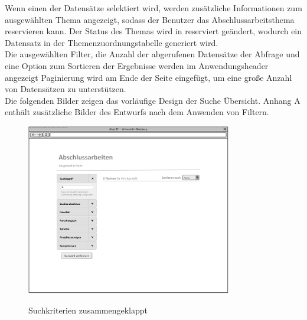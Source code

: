 Wenn einen der Datensätze selektiert wird, werden zusätzliche Informationen zum ausgewählten Thema angezeigt, sodass der Benutzer das Abschlussarbeitsthema reservieren kann. Der Status des Themas wird in reserviert geändert, wodurch ein Datensatz in der Themenzuordnungstabelle generiert wird.\\
Die ausgewählten Filter, die Anzahl der abgerufenen Datensätze der Abfrage und eine Option zum Sortieren der Ergebnisse werden im Anwendungsheader angezeigt
Paginierung wird am Ende der Seite eingefügt, um eine gro{\ss}e Anzahl von Datensätzen zu unterstützen.\\

Die folgenden Bilder zeigen das vorläufige Design der Suche Übersicht. Anhang A enthält zusätzliche Bilder des Entwurfs nach dem Anwenden von Filtern.

\begin{figure}[hp]%
    \centering
    \includegraphics[height=7.5cm,keepaspectratio]{pics/app_collapsed}\\
    \caption{Suchkriterien zusammengeklappt}
\end{figure}

